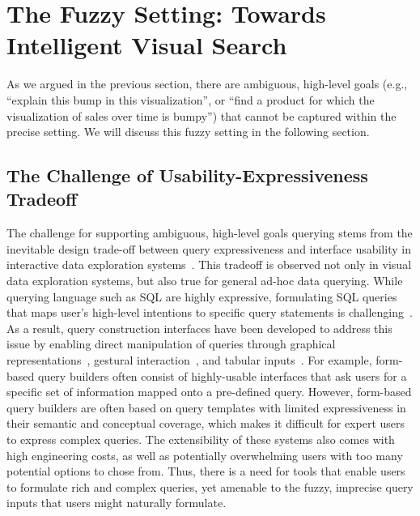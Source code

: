 \section{The Fuzzy Setting: Towards Intelligent Visual Search}\label{sec:vague}
\par As we argued in the previous section, 
there are ambiguous, high-level goals (e.g., 
``explain this bump in this visualization'', or ``find a product
for which the visualization of sales over time is bumpy'') that
cannot be captured within the precise setting. We will discuss this fuzzy setting in the following section. 


\subsection{The Challenge of Usability-Expressiveness Tradeoff}
\par The challenge for supporting ambiguous, 
high-level goals querying stems from the 
inevitable design trade-off between 
query expressiveness and interface 
usability in interactive data exploration 
systems~\cite{Jagadish2007,Morton2014}. 
This tradeoff is observed not only in 
visual data exploration systems, 
but also true for general ad-hoc data querying. 
While querying language such as SQL are highly expressive, 
formulating SQL queries that maps user's high-level intentions 
to specific query statements is challenging~\cite{Jagadish2007,Khoussainova2010}. 
As a result, query construction interfaces 
have been developed to address this issue by enabling 
direct manipulation of queries through 
graphical representations~\cite{Abouzied2012}, 
gestural interaction~\cite{Nandi2013}, and 
tabular inputs~\cite{Embley1989,Zloof1975}. 
For example, form-based query builders 
often consist of highly-usable interfaces 
that ask users for a specific set of information 
mapped onto a pre-defined query. 
However, form-based query builders 
are often based on query templates 
with limited expressiveness 
in their semantic and conceptual coverage, 
which makes it difficult for expert users 
to express complex queries. 
The extensibility of these systems 
also comes with high engineering costs, 
as well as potentially overwhelming users 
with too many potential options to chose from. 
Thus, there is a need for tools that enable users 
to formulate rich and complex queries, 
yet amenable to the fuzzy, imprecise query 
inputs that users might naturally formulate. 

